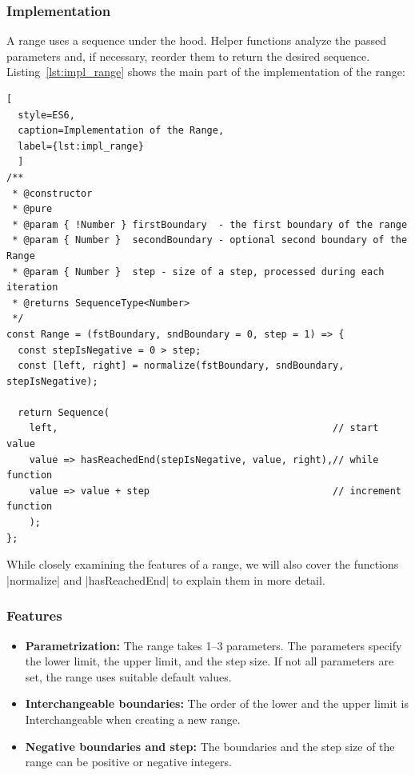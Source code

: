 \subsubsection{Implementation}
\label{subsub:Implementation}
A range uses a sequence under the hood. Helper functions analyze the passed
parameters and, if necessary, reorder them to return the desired sequence.
Listing~\ref{lst:impl_range} shows the main part of the implementation of the
range:

\begin{lstlisting}[
  style=ES6, 
  caption=Implementation of the Range,
  label={lst:impl_range}
  ]
/**
 * @constructor
 * @pure
 * @param { !Number } firstBoundary  - the first boundary of the range
 * @param { Number }  secondBoundary - optional second boundary of the Range
 * @param { Number }  step - size of a step, processed during each iteration
 * @returns SequenceType<Number>
 */
const Range = (fstBoundary, sndBoundary = 0, step = 1) => {
  const stepIsNegative = 0 > step;
  const [left, right] = normalize(fstBoundary, sndBoundary, stepIsNegative);

  return Sequence(
    left,                                                // start value
    value => hasReachedEnd(stepIsNegative, value, right),// while function
    value => value + step                                // increment function
    );
};
\end{lstlisting}

While closely examining the features of a range, we will also cover the functions
|normalize| and |hasReachedEnd| to explain them in more detail.

\subsubsection{Features}
\label{subsub:Features}

\begin{itemize}
  \item \textbf{Parametrization:} The range takes 1–3 parameters. The
    parameters specify the lower limit, the upper limit, and the step size. If
  not all parameters are set, the range uses suitable default values.
\item \textbf{Interchangeable boundaries:} The order of the lower and the upper
  limit is Interchangeable when creating a new range.
\item \textbf{Negative boundaries and step:} The boundaries and the step size
  of the range can be positive or negative integers.
\end{itemize}

